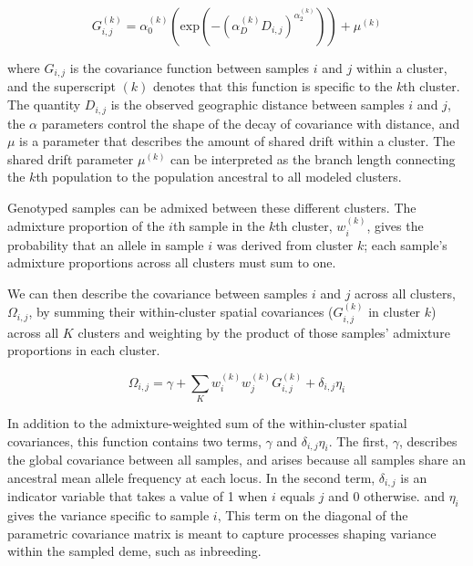 \documentclass[12pt]{article}
\begin{document}
\begin{equation}
G^{(k)}_{i,j} = \alpha^{(k)}_0 \left( \text{exp} \left( -(\alpha^{(k)}_D D_{i,j}) ^ {\alpha^{(k)}_2}	\right) \right) + \mu^{(k)}
\label{within_cluster_covariance}
\end{equation}

where $G_{i,j}$ is the covariance function between samples $i$ and $j$ within a cluster,
and the superscript $(k)$ denotes that this function is specific to the $k$th cluster.
The quantity $D_{i,j}$ is the observed geographic distance between samples $i$ and $j$,
the $\alpha$ parameters control the shape of the decay of covariance with distance,
and $\mu$ is a parameter that describes the amount of shared drift within a cluster.
The shared drift parameter $\mu^{(k)}$ can be interpreted as the branch length connecting 
the $k$th population to the population ancestral to all modeled clusters.

Genotyped samples can be admixed between these different clusters. 
The admixture proportion of the $i$th sample in the $k$th cluster, $w^{(k)}_i$,
gives the probability that an allele in sample $i$ was derived from cluster $k$;
each sample's admixture proportions across all clusters must sum to one.

We can then describe the covariance between samples $i$ and $j$ across all clusters, $\Omega_{i,j}$,
by summing their within-cluster spatial covariances ($G_{i,j}^{(k)}$ in cluster $k$) across all $K$ clusters
and weighting by the product of those samples' admixture proportions in each cluster.

\begin{equation}
\Omega_{i,j} = \gamma + \sum\limits_K w^{(k)}_i w^{(k)}_j G^{(k)}_{i,j} + \delta_{i,j}\eta_i
\label{cross_cluster_covariance}
\end{equation}

In addition to the admixture-weighted sum of the within-cluster spatial covariances,
this function contains two terms, $\gamma$ and $\delta_{i,j}\eta_i$.
The first, $\gamma$, describes the global covariance between all samples, 
and arises because all samples share an ancestral mean allele frequency at each locus.
In the second term, $\delta_{i,j}$ is an indicator variable that takes a value of 1 when $i$ equals $j$ and 0 otherwise. 
and $\eta_i$ gives the variance specific to sample $i$, 
This term on the diagonal of the parametric covariance matrix 
is meant to capture processes shaping variance within the sampled deme, 
such as inbreeding.
\end{document}
